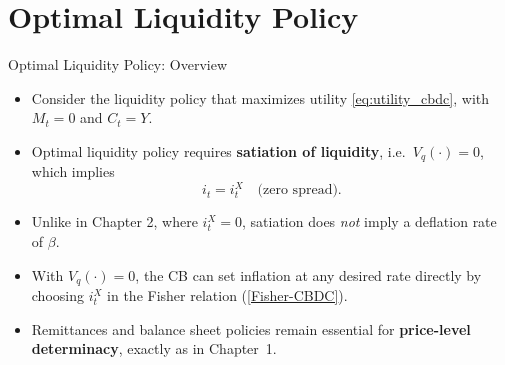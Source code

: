 \documentclass[11pt,aspectratio=169]{beamer}
\begin{document}
\section{Optimal Liquidity Policy}

\begin{frame}{Optimal Liquidity Policy: Overview}
\small

\begin{itemize}
    \item Consider the liquidity policy that maximizes utility \eqref{eq:utility_cbdc}, with $M_t=0$ and $C_t = Y$.
    \vspace{0.9em}

    \item Optimal liquidity policy requires \textbf{satiation of liquidity}, i.e.\ $V_q(\cdot)=0$, which implies  
    \[
      i_t = i_t^X
      \quad\text{(zero spread)}.
    \]
    \item Unlike in Chapter 2, where $i_t^X = 0$, satiation does \emph{not} imply a deflation rate of $\beta$.

    \item With $V_q(\cdot)=0$, the CB can set inflation at any desired rate directly by choosing $i_t^X$ in the Fisher relation (\ref{Fisher-CBDC}).

    \item Remittances and balance sheet policies remain essential for \textbf{price-level determinacy}, exactly as in Chapter~1.
\end{itemize}

\end{frame}
\end{document}
